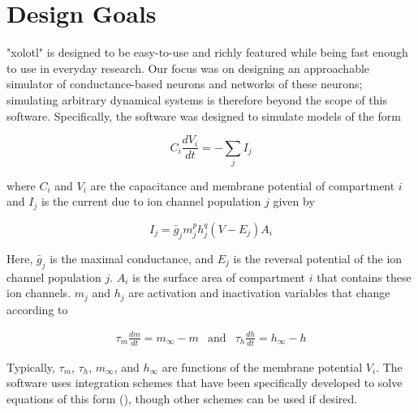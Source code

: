 \documentclass{frontiersSCNS} %
\begin{document}
%
%
%
%
%
%

\section{Design Goals}
\label{design}

"xolotl" is designed to be easy-to-use and richly featured while being fast enough to use in everyday research. Our focus was on designing an approachable simulator of conductance-based neurons and networks of these neurons; simulating arbitrary dynamical systems is therefore beyond the scope of this software. Specifically, the software was designed to simulate models of the form


\begin{equation}
C_{i}\frac{dV_{i}}{dt}=-\sum_{j}I_{j} \label{eq:1}
\end{equation}

where \( C_{i} \) and  \( V_{i} \) are the capacitance and membrane potential of compartment  \( i \) and \( I_{j} \) is the current due to ion channel population \( j \) given by

\begin{equation}
I_{j}=\bar{g}_{j}m_{j}^{p}h_{j}^{q}(V-E_{j})A_{i}  \label{eq:2}
\end{equation}

Here, \( \bar{g}_{j} \) is the maximal conductance, and \( E_{j} \) is the reversal potential of the ion channel population \( j \). \( A_{i} \) is the surface area of compartment \( i\) that contains these ion channels.  \( m_{j} \) and \( h_{j} \) are activation and inactivation variables that change according to

\begin{eqnarray*}
\tau_{m}\frac{dm}{dt}=m_{\infty}-m & \mathrm{and} & \tau_{h}\frac{dh}{dt}=h_{\infty}-h
\end{eqnarray*}

Typically, \( \tau_{m} \), \( \tau_{h} \), \( m_{\infty} \), and \( h_{\infty} \) are functions of the membrane potential \( V_{i} \). The software uses integration schemes that have been specifically developed to solve equations of this form (\cite{dayanTheoreticalNeuroscience2001, hinesEfficientComputationBranched1984, ohErrorAnalysisSpecialized2006}), though other schemes can be used if desired.
\end{document}
